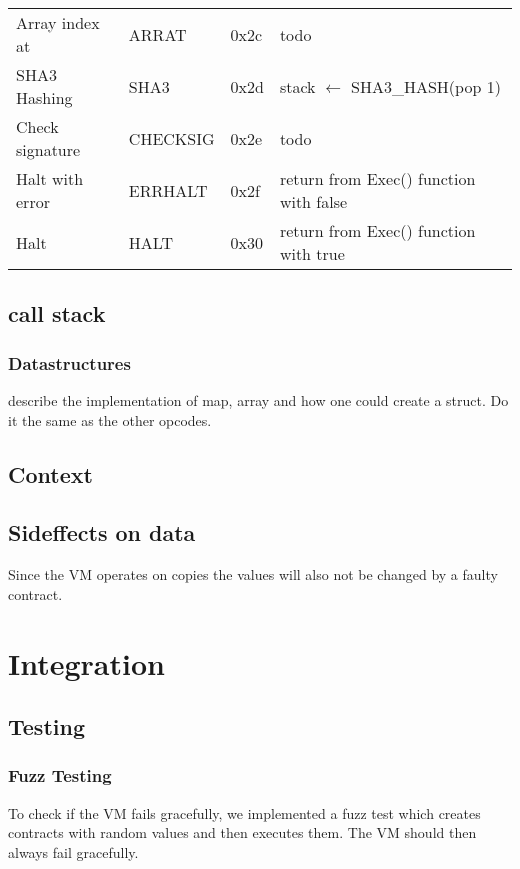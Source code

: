 \begin{table}[]
\begin{tabular}{@{}llll@{}}
Array index at       & ARRAT             & 0x2c            & todo                                                     \\
SHA3 Hashing         & SHA3              & 0x2d            & stack $\leftarrow$ SHA3\_HASH(pop 1)                                \\
Check signature      & CHECKSIG          & 0x2e            & todo                                                     \\
Halt with error      & ERRHALT           & 0x2f            & return from Exec() function with false                   \\
Halt                 & HALT              & 0x30            & return from Exec() function with true                    \\ \bottomrule
\end{tabular}
\end{table}

\subsection{call stack}

\subsubsection{Datastructures}
describe the implementation of map, array and how one could create a struct. Do it the same as the other opcodes.


\subsection{Context}

\subsection{Sideffects on data}

Since the VM operates on copies the values will also not be changed by a faulty contract.

\section{Integration}

\subsection{Testing}


\subsubsection{Fuzz Testing}
To check if the VM fails gracefully, we implemented a fuzz test which creates contracts with random values and then executes them. The VM should then always fail gracefully.

